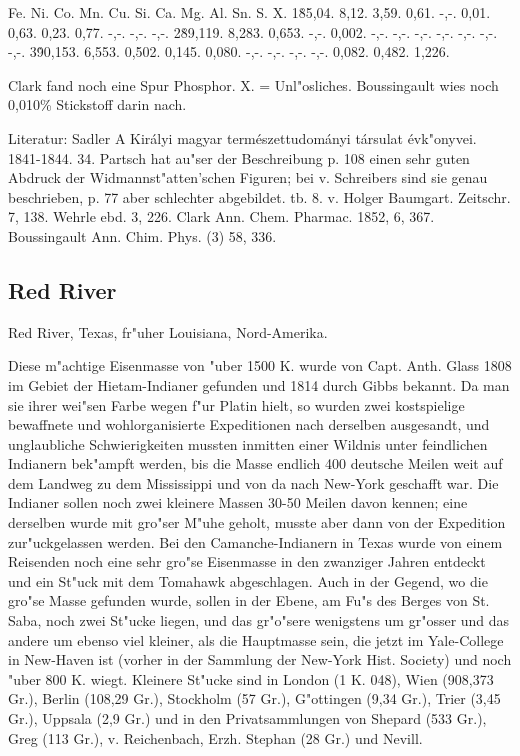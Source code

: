 \documentclass[a4paper, 11pt, oneside]{article}
\begin{document}
Fe. Ni. Co. Mn. Cu. Si. Ca. Mg. Al. Sn. S. X.  
1\. 85,04. 8,12. 3,59. 0,61. -,-. 0,01. 0,63. 0,23. 0,77. -,-. -,-. -,-.  
2\. 89,119. 8,283. 0,653. -,-. 0,002. -,-. -,-. -,-. -,-. -,-. -,-. -,-.  
3\. 90,153. 6,553. 0,502. 0,145. 0,080. -,-. -,-. -,-. -,-. 0,082. 0,482. 1,226.

Clark fand noch eine Spur Phosphor. X. = Unl"osliches. Boussingault wies noch 0,010\% Stickstoff darin nach.

Literatur: Sadler A Királyi magyar természettudományi társulat évk"onyvei. 1841-1844. 34. Partsch hat au"ser der Beschreibung p. 108 einen sehr guten Abdruck der Widmannst"atten'schen Figuren; bei v. Schreibers sind sie genau beschrieben, p. 77 aber schlechter abgebildet. tb. 8. v. Holger Baumgart. Zeitschr. 7, 138. Wehrle ebd. 3, 226. Clark Ann. Chem. Pharmac. 1852, 6, 367. Boussingault Ann. Chim. Phys. (3) 58, 336.

\subsection{Red River}

Red River, Texas, fr"uher Louisiana, Nord-Amerika.

Diese m"achtige Eisenmasse von "uber 1500 K. wurde von Capt. Anth. Glass 1808 im Gebiet der Hietam-Indianer gefunden und 1814 durch Gibbs bekannt. Da man sie ihrer wei"sen Farbe wegen f"ur Platin hielt, so wurden zwei kostspielige bewaffnete und wohlorganisierte Expeditionen nach derselben ausgesandt, und unglaubliche Schwierigkeiten mussten inmitten einer Wildnis unter feindlichen Indianern bek"ampft werden, bis die Masse endlich 400 deutsche Meilen weit auf dem Landweg zu dem Mississippi und von da nach New-York geschafft war. Die Indianer sollen noch zwei kleinere Massen 30-50 Meilen davon kennen; eine derselben wurde mit gro"ser M"uhe geholt, musste aber dann von der Expedition zur"uckgelassen werden. Bei den Camanche-Indianern in Texas wurde von einem Reisenden noch eine sehr gro"se Eisenmasse in den zwanziger Jahren entdeckt und ein St"uck mit dem Tomahawk abgeschlagen. Auch in der Gegend, wo die gro"se Masse gefunden wurde, sollen in der Ebene, am Fu"s des Berges von St. Saba, noch zwei St"ucke liegen, und das gr"o"sere wenigstens um gr"osser und das andere um ebenso viel kleiner, als die Hauptmasse sein, die jetzt im Yale-College in New-Haven ist (vorher in der Sammlung der New-York Hist. Society) und noch "uber 800 K. wiegt. Kleinere St"ucke sind in London (1 K. 048), Wien (908,373 Gr.), Berlin (108,29 Gr.), Stockholm (57 Gr.), G"ottingen (9,34 Gr.), Trier (3,45 Gr.), Uppsala (2,9 Gr.) und in den Privatsammlungen von Shepard (533 Gr.), Greg (113 Gr.), v. Reichenbach, Erzh. Stephan (28 Gr.) und Nevill.
\end{document}
